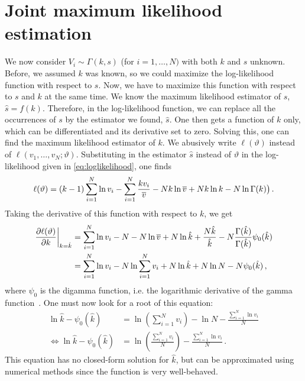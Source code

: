 \documentclass[final]{aomart}
\newtheorem[{}\it]{thm}{Theorem}[section]
\theoremstyle{definition}
\newtheorem*[{}\it]{notation}{Notation}
\numberwithin{equation}{section}
\newcommand{\dig}{\psi_0}
\renewcommand{\theta}{\vartheta}
\newcommand{\eval}[2][\right]{\relax
  \ifx#1\right\relax \left.\fi#2#1\rvert}
\begin{document}
\section{Joint maximum likelihood estimation}
\label{sec:joint}
We now consider \(V_i \sim \Gamma(k, s)\) (for \(i = 1,\ldots,N)\) with both \(k\) and \(s\) unknown.
Before, we assumed \(k\) was known, so we could maximize the log-likelihood function with respect to \(s\).
Now, we have to maximize this function with respect to \(s\) and \(k\) at the same time.
We know the maximum likelihood estimator of \(s\), \(\hat{s} = f(k)\).
Therefore, in the log-likelihood function, we can replace all the occurrences of \(s\) by the estimator we found, \(\hat{s}\).
One then gets a function of \(k\) only, which can be differentiated and its derivative set to zero.
Solving this, one can find the maximum likelihood estimator of \(k\).
We abusively write \(\ell(\theta)\) instead of \(\ell(v_1, \ldots, v_N; \theta)\).
Substituting in the estimator \(\hat{s}\) instead of \(\theta\) in the log-likelihood given in \eqref{eq:loglikelihood}, one finds
\begin{align}
\ell(\theta) = (k-1) \sum_{i=1}^{N}\ln v_i - \sum_{i=1}^{N} \frac{kv_i}{\widebar{v}} - N k \ln \widebar{v} + N k \ln k - N \ln \Gamma(k)\big)\,.
\end{align}
Taking the derivative of this function with respect to \(k\), we get
\begin{align}
\eval{\frac{\partial \ell(\theta)}{\partial k}}_{k = \hat{k}} &= \sum_{i=1}^N \ln v_i - N - N \ln \widebar{v} + N \ln \hat{k} + \frac{N\hat{k}}{\hat{k}} - N\frac{\Gamma(\hat{k})}{\Gamma(\hat{k})}\dig(\hat{k})\\
&= \sum_{i=1}^N \ln v_i - N \ln \sum_{i=1}^N v_i + N \ln \hat{k}  + N \ln N - N \dig(\hat{k})\,,
\end{align}
where \(\dig\) is the digamma function, i.e. the logarithmic derivative of the gamma function~\cite{wolf:dig}.
One must now look for a root of this equation:
\begin{align}
\ln \hat{k} - \dig(\hat{k}) &= \ln \left(\sum_{i=1}^N v_i\right) - \ln N - \frac{\sum_{i=1}^N \ln v_i}{N}\\
\iff \ln \hat{k}  - \dig(\hat{k}) &= \ln \left(\frac{\sum_{i=1}^N v_i}{N}\right) - \frac{\sum_{i=1}^N \ln v_i}{N}\,.\label{eq:mlk}
\end{align}
This equation has no closed-form solution for \(\hat{k}\), but can be approximated using numerical methods since the function is very well-behaved.
\end{document}
